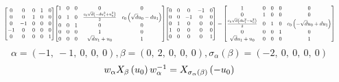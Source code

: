 \documentclass[11pt]{article}
\theoremstyle{definition}
\begin{document}
\[
\scaletoalign{\textwidth}{{\left[\begin{matrix}0 & 0 & 0 & 1 & 0\\0 & 0 & 1 & 0 & 0\\0 & -1 & 0 & 0 & 0\\-1 & 0 & 0 & 0 & 0\\0 & 0 & 0 & 0 & 1\end{matrix}\right]} {\left[\begin{matrix}1 & 0 & 0 & 0 & 0\\0 & 1 & 0 & \frac{c_{0} \sqrt{d} \left(- d u_{1}^{2} + u_{0}^{2}\right)}{2} & c_{0} \left(\sqrt{d} u_{0} - d u_{1}\right)\\0 & 0 & 1 & 0 & 0\\0 & 0 & 0 & 1 & 0\\0 & 0 & 0 & \sqrt{d} u_{1} + u_{0} & 1\end{matrix}\right]} {\left[\begin{matrix}0 & 0 & 0 & -1 & 0\\0 & 0 & -1 & 0 & 0\\0 & 1 & 0 & 0 & 0\\1 & 0 & 0 & 0 & 0\\0 & 0 & 0 & 0 & 1\end{matrix}\right]} = {\left[\begin{matrix}1 & 0 & 0 & 0 & 0\\0 & 1 & 0 & 0 & 0\\\frac{c_{0} \sqrt{d} \left(d u_{1}^{2} - u_{0}^{2}\right)}{2} & 0 & 1 & 0 & c_{0} \left(- \sqrt{d} u_{0} + d u_{1}\right)\\0 & 0 & 0 & 1 & 0\\\sqrt{d} u_{1} + u_{0} & 0 & 0 & 0 & 1\end{matrix}\right]}}
\]
\[
\alpha = \left( -1, \  -1, \  0, \  0, \  0\right), \beta = \left( 0, \  2, \  0, \  0, \  0\right), \sigma_{\alpha}(\beta) = \left( -2, \  0, \  0, \  0, \  0\right)
\]
\[
\scaletoalign{\textwidth}{w_{\alpha} X_{\beta}\left(u_{0}\right) w_{\alpha}^{-1} = X_{\sigma_{\alpha}\left(\beta\right)}\left(- u_{0}\right)}
\]
\end{document}
